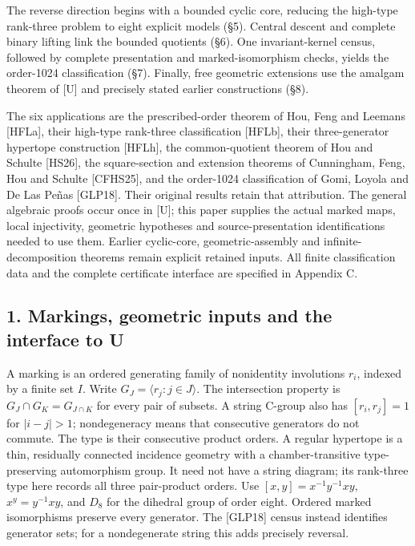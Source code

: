 \documentclass[
  11pt,
  a4paper,
]{article}
\begin{document}
The reverse direction begins with a bounded cyclic core, reducing the
high-type rank-three problem to eight explicit models (§5). Central
descent and complete binary lifting link the bounded quotients (§6). One
invariant-kernel census, followed by complete presentation and
marked-isomorphism checks, yields the order-1024 classification (§7).
Finally, free geometric extensions use the amalgam theorem of {[}U{]}
and precisely stated earlier constructions (§8).

The six applications are the prescribed-order theorem of Hou, Feng and
Leemans {[}HFLa{]}, their high-type rank-three classification
{[}HFLb{]}, their three-generator hypertope construction {[}HFLh{]}, the
common-quotient theorem of Hou and Schulte {[}HS26{]}, the
square-section and extension theorems of Cunningham, Feng, Hou and
Schulte {[}CFHS25{]}, and the order-1024 classification of Gomi, Loyola
and De Las Peñas {[}GLP18{]}. Their original results retain that
attribution. The general algebraic proofs occur once in {[}U{]}; this
paper supplies the actual marked maps, local injectivity, geometric
hypotheses and source-presentation identifications needed to use them.
Earlier cyclic-core, geometric-assembly and infinite-decomposition
theorems remain explicit retained inputs. All finite classification data
and the complete certificate interface are specified in Appendix C.

\subsection{1. Markings, geometric inputs and the interface to
U}\label{markings-geometric-inputs-and-the-interface-to-u}

A marking is an ordered generating family of nonidentity involutions
\(r_i\), indexed by a finite set \(I\). Write
\(G_J=\langle r_j:j\in J\rangle\). The intersection property is
\(G_J\cap G_K=G_{J\cap K}\) for every pair of subsets. A string C-group
also has \([r_i,r_j]=1\) for \(|i-j|>1\); nondegeneracy means that
consecutive generators do not commute. The type is their consecutive
product orders. A regular hypertope is a thin, residually connected
incidence geometry with a chamber-transitive type-preserving
automorphism group. It need not have a string diagram; its rank-three
type here records all three pair-product orders. Use
\([x,y]=x^{-1}y^{-1}xy\), \(x^y=y^{-1}xy\), and \(D_8\) for the dihedral
group of order eight. Ordered marked isomorphisms preserve every
generator. The {[}GLP18{]} census instead identifies generator sets; for
a nondegenerate string this adds precisely reversal.
\end{document}
